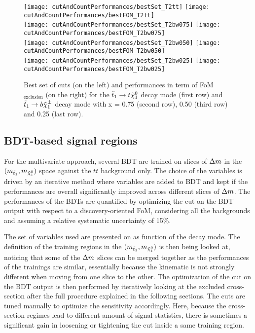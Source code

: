     \begin{figure}[h!]
        \centering
        \texttt{[image: cutAndCountPerformances/bestSet\_T2tt]}
        \texttt{[image: cutAndCountPerformances/bestFOM\_T2tt]}\\
        \texttt{[image: cutAndCountPerformances/bestSet\_T2bw075]}
        \texttt{[image: cutAndCountPerformances/bestFOM\_T2bw075]}\\
        \texttt{[image: cutAndCountPerformances/bestSet\_T2bw050]}
        \texttt{[image: cutAndCountPerformances/bestFOM\_T2bw050]}\\
        \texttt{[image: cutAndCountPerformances/bestSet\_T2bw025]}
        \texttt{[image: cutAndCountPerformances/bestFOM\_T2bw025]}
        \caption{Best set of cuts (on the left) and performances in term of
        FoM$_\text{exclusion}$ (on the right) for the $\tilde{t}_1 \rightarrow t
        \tilde{\chi}_1^0$ decay mode (first row) and $\tilde{t}_1 \rightarrow b
        \tilde{\chi}_1^\pm$ decay mode with x = 0.75 (second row), 0.50 (third row) and
        0.25 (last row).}
        \label{fig:cutAndCountPerformances}
    \end{figure}

        \subsection{BDT-based signal regions}

    For the multivariate approach, several BDT are trained on slices of
    $\Delta m$ in the $(m_{\tilde{t}_1},m_{\tilde{\chi}_1^0})$ space against the
    $t\bar{t}$ background only.  The choice of the variables is driven by an
    iterative method where variables are added to BDT and kept if the
    performances are overall significantly improved across different slices of
    $\Delta m$. The performances of the BDTs are quantified by optimizing the cut
    on the BDT output with respect to a discovery-oriented FoM, considering all
    the backgrounds and assuming a relative systematic uncertainty of 15\%.

    The set of variables used are presented on  as
    function of the decay mode. The definition of the training regions in the
    $(m_{\tilde{t}_1},m_{\tilde{\chi}_1^0})$ is then being looked at, noticing that
    some of the $\Delta m$ slices can be merged together as the performances of
    the trainings are similar, essentially because the kinematic is not strongly
    different when moving from one slice to the other. The optimization of the
    cut on the BDT output is then performed by iteratively looking at the
    excluded cross-section after the full procedure explained in the following
    sections. The cuts are tuned manually to optimize the sensitivity
    accordingly. Here, because the cross-section regimes lead to different
    amount of signal statistics, there is sometimes a significant gain in
    loosening or tightening the cut inside a same training region.

